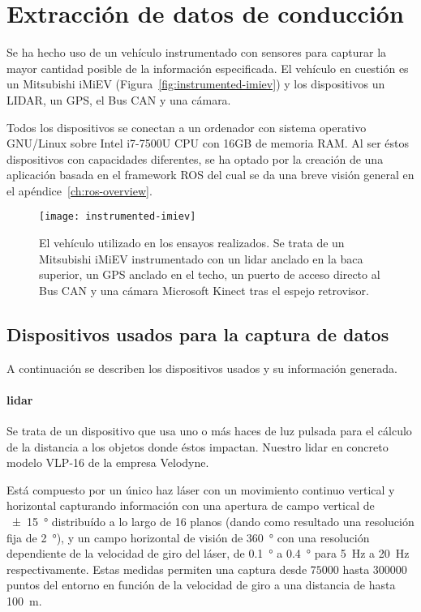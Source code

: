 \section{Extracción de datos de conducción}

Se ha hecho uso de un vehículo instrumentado con sensores para capturar la mayor cantidad posible de la información especificada. El vehículo en cuestión es un Mitsubishi iMiEV (Figura~\ref{fig:instrumented-imiev}) y los dispositivos un LIDAR, un GPS, el Bus CAN y una cámara.

Todos los dispositivos se conectan a un ordenador con sistema operativo GNU/Linux sobre Intel i7-7500U CPU con 16GB de memoria RAM. Al ser éstos dispositivos con capacidades diferentes, se ha optado por la creación de una aplicación basada en el framework ROS del cual se da una breve visión general en el apéndice~\ref{ch:ros-overview}.

\begin{figure}[t]
	\centering
	\texttt{[image: instrumented-imiev]}
	\caption[Vehículo instrumentado utilizado en los ensayos]{El vehículo utilizado en los ensayos realizados. Se trata de un Mitsubishi iMiEV instrumentado con un \acrshort{lidar} anclado en la baca superior, un GPS anclado en el techo, un puerto de acceso directo al Bus CAN y una cámara Microsoft Kinect tras el espejo retrovisor.}
	\label{fig:instrumented-imievschema}
\end{figure}

\subsection{Dispositivos usados para la captura de datos}

A continuación se describen los dispositivos usados y su información generada.

\paragraph{\acrfull{lidar}}

Se trata de un dispositivo que usa uno o más haces de luz pulsada para el cálculo de la distancia a los objetos donde éstos impactan. Nuestro \ac{lidar} en concreto modelo VLP-16 de la empresa Velodyne.

Está compuesto por un único haz láser con un movimiento continuo vertical y horizontal capturando información con una apertura de campo vertical de \SI{\pm15}{\degree} distribuído a lo largo de 16 planos (dando como resultado una resolución fija de \SI{2}{\degree}), y un campo horizontal de visión de \SI{360}{\degree} con una resolución dependiente de la velocidad de giro del láser, de \SI{0.1}{\degree} a \SI{0.4}{\degree} para \SI{5}{\Hz} a \SI{20}{\Hz} respectivamente. Estas medidas permiten una captura desde $75000$ hasta $300000$ puntos del entorno en función de la velocidad de giro a una distancia de hasta \SI{100}{\meter}.

